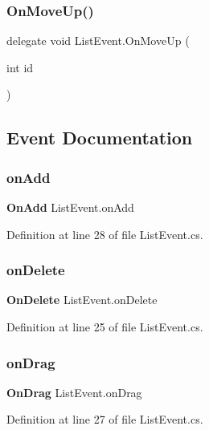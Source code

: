 \subsubsection{On\+Move\+Up()}
{\footnotesize\ttfamily delegate void List\+Event.\+On\+Move\+Up (\begin{DoxyParamCaption}\item[{int}]{id }\end{DoxyParamCaption})}



\subsection{Event Documentation}
\mbox{\label{class_list_event_af4ce6a1530f827a5d195ca5016680f44}} 
\subsubsection{on\+Add}
{\footnotesize\ttfamily \textbf{ On\+Add} List\+Event.\+on\+Add}



Definition at line 28 of file List\+Event.\+cs.

\mbox{\label{class_list_event_a5db22179349e9328ec72003df713c45a}} 
\subsubsection{on\+Delete}
{\footnotesize\ttfamily \textbf{ On\+Delete} List\+Event.\+on\+Delete}



Definition at line 25 of file List\+Event.\+cs.

\mbox{\label{class_list_event_a21b76df8c6350740e1ade1805a7f278c}} 
\subsubsection{on\+Drag}
{\footnotesize\ttfamily \textbf{ On\+Drag} List\+Event.\+on\+Drag}



Definition at line 27 of file List\+Event.\+cs.

\mbox{\label{class_list_event_a8745ad92dcd6dcabf4c4cbcc20ddd3ca}} 
